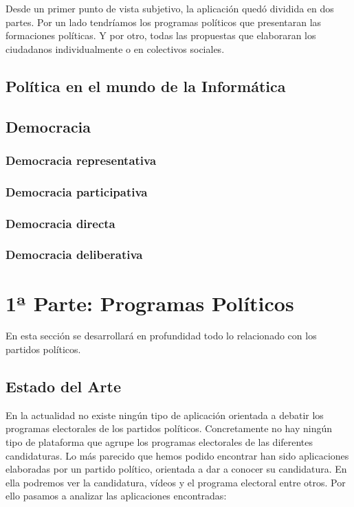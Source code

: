 Desde un primer punto de vista subjetivo, la aplicación quedó dividida en dos partes. Por un lado tendríamos los programas políticos que presentaran las formaciones políticas. Y por otro, todas las propuestas que elaboraran los ciudadanos individualmente o en colectivos sociales.

\subsection{Política en el mundo de la Informática}

\subsection{Democracia}

	\subsubsection{Democracia representativa}
	
	\subsubsection{Democracia participativa}
	
	\subsubsection{Democracia directa}
	
	\subsubsection{Democracia deliberativa}
	

\section{1ª Parte: Programas Políticos}
En esta sección se desarrollará en profundidad todo lo relacionado con los partidos políticos.

  \subsection{Estado del Arte}
En la actualidad no existe ningún tipo de aplicación orientada a debatir los programas electorales de los partidos políticos. Concretamente no hay ningún tipo de plataforma que agrupe los programas electorales de las diferentes candidaturas.
Lo más parecido que hemos podido encontrar han sido aplicaciones elaboradas por un partido político, orientada a dar a conocer su candidatura. En ella podremos ver la candidatura, vídeos y el programa electoral entre otros. Por ello pasamos a analizar las aplicaciones encontradas:

